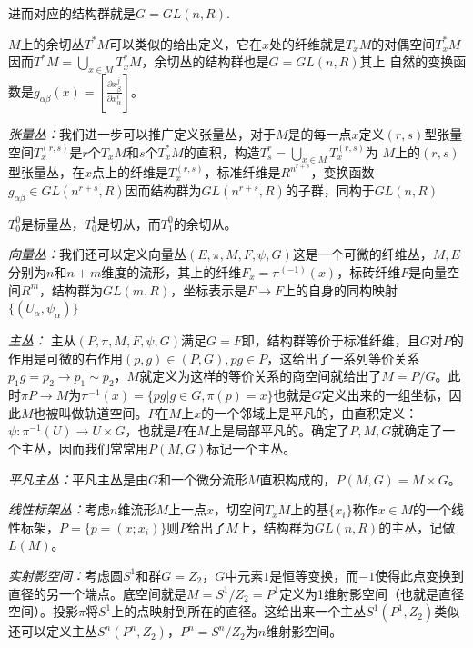 \documentclass[supercite]{HustGraduPaper}
\begin{document}
\begin{appendices}
		进而对应的结构群就是$G = GL(n,R)$.
		
		$M$上的余切丛$T^*M$可以类似的给出定义，它在$x$处的纤维就是$T_xM$的对偶空间$T_x^*M$ 因而$T^*M = \bigcup_{x \in M} T_x^*M$，余切丛的结构群也是$G = GL(n,R)$其上
		自然的变换函数是$g_{\alpha \beta}(x)= [\frac{\partial x_\beta^j}{\partial x_\alpha^i}]$。
		
		\textit{张量丛：}我们进一步可以推广定义张量丛，对于$M$是的每一点$x$定义$(r,s)$型张量空间$T^{(r,s)}_x $是$r$个$T_xM$和$s$个$T^*_xM$的直积，构造$T^r_s  = \bigcup_{x\in M} T^{(r,s)}_x$为
		$M$上的$(r,s)$型张量丛，在$x$点上的纤维是$T^{(r,s)}_x$，标准纤维是$R^{n^{r+s}}$，变换函数$g_{\alpha \beta} \in GL({n^{r+s}},R)$因而结构群为$GL(n^{r+s},R)$的子群，同构于$GL(n,R)$
		
		$T^0_0$是标量丛，$T^1_0$是切从，而$T^0_1$的余切从。
		
		\textit{向量丛：}我们还可以定义向量丛$(E,\pi,M,F,\psi,G)$这是一个可微的纤维丛，$M,E$分别为$n$和$n+m$维度的流形，其上的纤维$F_x = \pi^(-1)(x)$，标砖纤维$F$是向量空间$R^m$，结构群为$GL(m,R)$，坐标表示是$F \to F$上的自身的同构映射$\{(U_\alpha,\psi_\alpha)\}$
		
		\textit{主丛：} 主从$(P,\pi,M,F,\psi,G)$满足$G=F$即，结构群等价于标准纤维，且$G$对$P$的作用是可微的右作用$(p,g) \in (P,G), pg \in P$，这给出了一系列等价关系$p_1 g = p_2 \to p_1 \sim p_2$，$M$就定义为这样的等价关系的商空间就给出了$M  = P/G$。此时$\pi P \to M$为$\pi^{-1}(x) = \{pg| g \in G, \pi(p) = x\}$也就是$G$定义出来的一组坐标，因此$M$也被叫做轨道空间。$P$在$M$上$x$的一个邻域上是平凡的，由直积定义：$\psi: \pi^{-1}(U) \to U \times G$，也就是$P$在$M$上是局部平凡的。确定了$P,M,G$就确定了一个主丛，因而我们常常用$P(M,G)$标记一个主丛。
		
		\textit{平凡主丛：}平凡主丛是由$G$和一个微分流形$M$直积构成的，$P(M,G) = M \times G$。
		
		\textit{线性标架丛：}考虑$n$维流形$M$上一点$x$，切空间$T_xM$上的基$\{x_i\}$称作$x \in M$的一个线性标架，$P  = \{p = (x; x_i)\}$则$P$给出了$M$上，结构群为$GL(n,R)$的主丛，记做$L(M)$。
		
		\textit{实射影空间：}考虑圆$S^1$和群$G = Z_2$，$G$中元素$1$是恒等变换，而$-1$使得此点变换到直径的另一个端点。底空间就是$M = S^1/ Z_2 = P^1$定义为1维射影空间（也就是直径空间）。投影$\pi$将$S^1$上的点映射到所在的直径。这给出来一个主丛$S^1(P^1,Z_2)$类似还可以定义主丛$S^n(P^n,Z_2)$，$P^n = S^n/Z_2$为$n$维射影空间。                                                                                                                                                                                                                                                                                       
		

\end{appendices}
\end{document}
